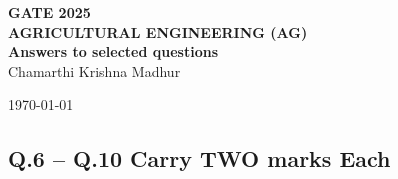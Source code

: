 \documentclass{article}
\begin{document}
\begin{titlepage}
    \begin{center}
        \vfill
        \vspace*{5cm}
        \Huge\textbf{GATE 2025 \\ \vspace{0.5cm} AGRICULTURAL ENGINEERING (AG)}\\
        \vspace{2cm}
        \huge \textbf{{Answers to selected questions}}\\
        \vspace{4cm}
        \huge Chamarthi Krishna Madhur\\
        \vspace{1cm}
        
        \today
        
    \end{center}
\end{titlepage}

\pagestyle{fancy}

\newpage
\fancyhf{} %
\renewcommand{\footrulewidth}{0.4pt}





 \subsection*{Q.6 – Q.10 Carry TWO marks Each}
 
\end{document}
